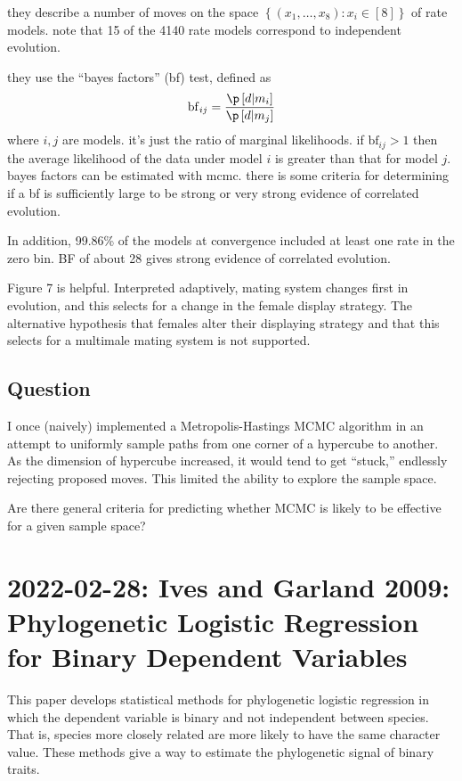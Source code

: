 \documentclass{article}
\def\[{\left [} \def\]{\right ]} \def\({\left (} \def\){\right )}
\begin{document}
they describe a number of moves on the space $\left\{ (x_{1},\ldots,x_{8}):
x_{i}\in [8] \right\}$ of rate models. note that 15 of the 4140 rate models
correspond to independent evolution.

they use the ``bayes factors'' (bf) test, defined as
\begin{equation*} \mathrm{bf}_{ij}=\frac{\p\[ d|m_{i} \]}{\p\[ d|m_{j} \]}
\end{equation*} where $i,j$ are models. it's just the ratio of marginal
likelihoods. if $\mathrm{bf}_{ij}>1$ then the average likelihood of the data
under model $i$ is greater than that for model $j$. bayes factors can be
estimated with mcmc. there is some criteria for determining if a bf is
sufficiently large to be strong or very strong evidence of correlated evolution.


In addition, 99.86\% of the models at convergence included at least one rate in
the zero bin. BF of about 28 gives strong evidence of correlated evolution.

Figure 7 is helpful. Interpreted adaptively, mating system changes first in
evolution, and this selects for a change in the female display strategy. The
alternative hypothesis that females alter their displaying strategy and that
this selects for a multimale mating system is not supported.


\subsection{Question} I once (naively) implemented a Metropolis-Hastings MCMC
algorithm in an attempt to uniformly sample paths from one corner of a hypercube
to another. As the dimension of hypercube increased, it would tend to get
``stuck,'' endlessly rejecting proposed moves. This limited the ability to
explore the sample space.

Are there general criteria for predicting whether MCMC is likely to be
effective for a given sample space?

\section{2022-02-28: Ives and Garland 2009: Phylogenetic Logistic Regression for
Binary Dependent Variables}

This paper develops statistical methods for phylogenetic logistic regression in
which the dependent variable is binary and not independent between species. That
is, species more closely related are more likely to have the same character
value. These methods give a way to estimate the phylogenetic signal of binary
traits.
\end{document}

